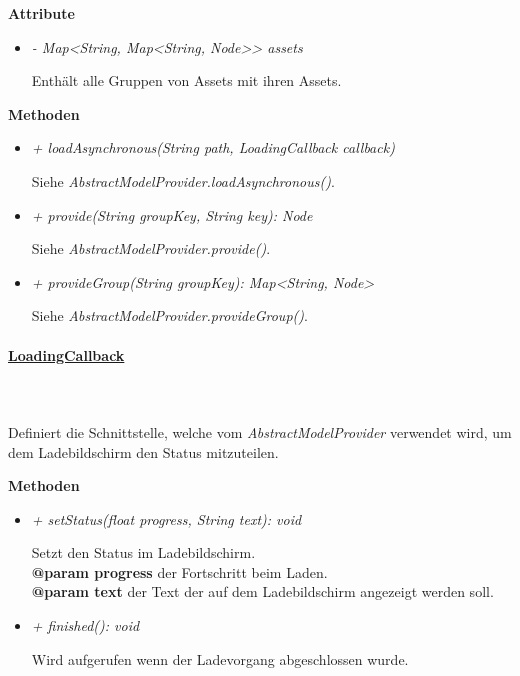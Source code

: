         \textbf{Attribute}
        \begin{itemize}
            \item \textit{- Map<String, Map<String, Node>> assets}
                \begin{leftbar}[0.9\linewidth]
                   Enthält alle Gruppen von Assets mit ihren Assets.
                \end{leftbar}
        \end{itemize}
        \textbf{Methoden}
        \begin{itemize}
            \item \textit{+ loadAsynchronous(String path, LoadingCallback callback)}
                \begin{leftbar}[0.9\linewidth]
                   Siehe \textit{AbstractModelProvider.loadAsynchronous()}.
                \end{leftbar}
            \item \textit{+ provide(String groupKey, String key): Node}
                \begin{leftbar}[0.9\linewidth]
                    Siehe \textit{AbstractModelProvider.provide()}.
                \end{leftbar}
            \item \textit{+ provideGroup(String groupKey): Map<String, Node>}
                \begin{leftbar}[0.9\linewidth]
                    Siehe \textit{AbstractModelProvider.provideGroup()}.
                \end{leftbar}
        \end{itemize}

    \paragraph{\underline{LoadingCallback}} \mbox{}\\
    \\
        Definiert die Schnittstelle, welche vom \textit{AbstractModelProvider} verwendet wird, um dem Ladebildschirm den Status mitzuteilen.\par

        \textbf{Methoden}
        \begin{itemize}
            \item \textit{+ setStatus(float progress, String text): void}
                \begin{leftbar}[0.9\linewidth]
                   Setzt den Status im Ladebildschirm.\\
                   \textbf{@param progress} der Fortschritt beim Laden.\\
                   \textbf{@param text} der Text der auf dem Ladebildschirm angezeigt werden soll.
                \end{leftbar}
            \item \textit{+ finished(): void}
                \begin{leftbar}[0.9\linewidth]
                    Wird aufgerufen wenn der Ladevorgang abgeschlossen wurde.
                \end{leftbar}
        \end{itemize}

